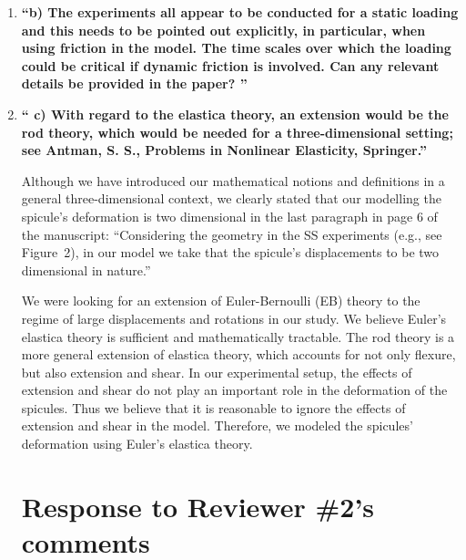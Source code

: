 \documentclass[11pt,letterpaper]{report}
\newcommand{\physe}{\hat{\mathbscr{e}}} %
\begin{document}
\begin{enumerate}[label=\textit{1.\arabic*},wide, labelwidth=!, labelindent=0pt]
\item \label{r1c3} {\bf ``b) The experiments all appear to be conducted for a static loading and this needs to be pointed out explicitly, in particular, when using friction in the model. The time scales over which the loading could be critical if dynamic friction is involved. Can any relevant details be provided in the paper?
''}



\item \label{r1c4} {\bf ``
c) With regard to the elastica theory, an extension would be the rod theory, which would be needed for a three-dimensional setting; see Antman, S. S., Problems in Nonlinear Elasticity, Springer.''}

Although we have introduced our mathematical notions and definitions in a general three-dimensional context, we clearly stated that our modelling the spicule's deformation is two dimensional in the last paragraph in page 6 of the manuscript:
``Considering the geometry in the SS experiments (e.g., see Figure~2), in our model we take that the spicule's displacements to be two dimensional in nature.'' 

We were looking for an extension of Euler-Bernoulli (EB) theory to the regime of large displacements and rotations in our study. We believe Euler's elastica theory is sufficient and mathematically tractable. 
The rod theory is a more general extension of elastica theory, which accounts for not only flexure, but also extension and shear. 
In our experimental setup, the effects of extension and shear do not play an important role in the deformation of the spicules. Thus we believe that it is reasonable to ignore the effects of extension and shear in the model. Therefore, we modeled the spicules' deformation using Euler's elastica theory. 




\clearpage

\section*{Response to Reviewer \#2's comments}
\label{rev2}


\end{enumerate}
\end{document}
